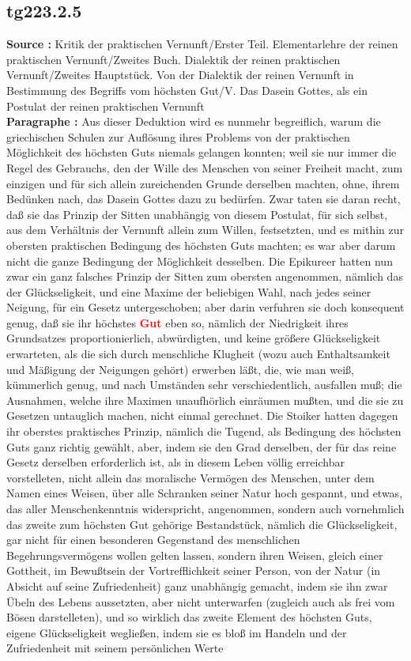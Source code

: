 \documentclass[a4paper,12pt,twoside]{book}
\newcommand{\match}[1]{\textcolor{red}{\textbf{#1}}}
\begin{document}
	\subsection*{tg223.2.5} 
	\textbf{Source : }Kritik der praktischen Vernunft/Erster Teil. Elementarlehre der reinen praktischen Vernunft/Zweites Buch. Dialektik der reinen praktischen Vernunft/Zweites Hauptstück. Von der Dialektik der reinen Vernunft in Bestimmung des Begriffs vom höchsten Gut/V. Das Dasein Gottes, als ein Postulat der reinen praktischen Vernunft\\  
	
	\noindent\textbf{Paragraphe : }Aus dieser Deduktion wird es nunmehr begreiflich, warum die griechischen Schulen zur Auflösung ihres Problems von der praktischen Möglichkeit des höchsten Guts niemals gelangen konnten; weil sie nur immer die Regel des Gebrauchs, den der Wille des Menschen von seiner Freiheit macht, zum einzigen und für sich allein zureichenden Grunde derselben machten, ohne, ihrem Bedünken nach, das Dasein Gottes dazu zu bedürfen. Zwar taten sie daran recht, daß sie das Prinzip der Sitten unabhängig von diesem Postulat, für sich selbst, aus dem Verhältnis der Vernunft allein zum Willen, festsetzten, und es mithin zur obersten praktischen Bedingung des höchsten Guts machten; es war aber darum nicht die ganze Bedingung der Möglichkeit desselben. Die Epikureer hatten nun zwar ein ganz falsches Prinzip der Sitten zum obersten angenommen, nämlich das der Glückseligkeit, und eine Maxime der beliebigen Wahl, nach jedes seiner Neigung, für ein Gesetz untergeschoben; aber darin verfuhren sie doch konsequent genug, daß sie ihr höchstes \match{Gut} eben so, nämlich der Niedrigkeit ihres Grundsatzes proportionierlich, abwürdigten, und keine größere Glückseligkeit erwarteten, als die sich durch menschliche Klugheit (wozu auch Enthaltsamkeit und Mäßigung der Neigungen gehört) erwerben läßt, die, wie man weiß, kümmerlich genug, und nach Umständen sehr verschiedentlich, ausfallen muß; die Ausnahmen, welche ihre  Maximen unaufhörlich einräumen mußten, und die sie zu Gesetzen untauglich machen, nicht einmal gerechnet. Die Stoiker hatten dagegen ihr oberstes praktisches Prinzip, nämlich die Tugend, als Bedingung des höchsten Guts ganz richtig gewählt, aber, indem sie den Grad derselben, der für das reine Gesetz derselben erforderlich ist, als in diesem Leben völlig erreichbar vorstelleten, nicht allein das moralische Vermögen des Menschen, unter dem Namen eines Weisen, über alle Schranken seiner Natur hoch gespannt, und etwas, das aller Menschenkenntnis widerspricht, angenommen, sondern auch vornehmlich das zweite zum höchsten Gut gehörige Bestandstück, nämlich die Glückseligkeit, gar nicht für einen besonderen Gegenstand des menschlichen Begehrungsvermögens wollen gelten lassen, sondern ihren Weisen, gleich einer Gottheit, im Bewußtsein der Vortrefflichkeit seiner Person, von der Natur (in Absicht auf seine Zufriedenheit) ganz unabhängig gemacht, indem sie ihn zwar Übeln des Lebens aussetzten, aber nicht unterwarfen (zugleich auch als frei vom Bösen darstelleten), und so wirklich das zweite Element des höchsten Guts, eigene Glückseligkeit wegließen, indem sie es bloß im Handeln und der Zufriedenheit mit seinem persönlichen Werte 
\end{document}
